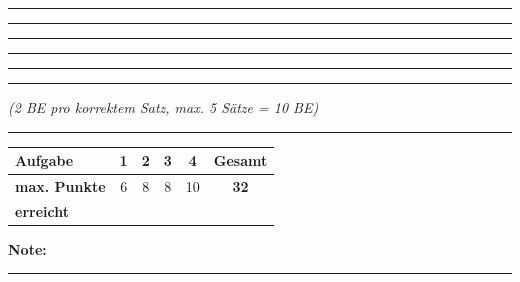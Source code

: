 \documentclass[11pt, a4paper]{article}
\newcommand{\luecke}[1]{\rule{#1}{0.4pt}}
\begin{document}
\vspace{0.8em}

\noindent
\rule{\textwidth}{0.4pt}

\vspace{1.2em}

\noindent
\rule{\textwidth}{0.4pt}

\vspace{1.2em}

\noindent
\rule{\textwidth}{0.4pt}

\vspace{1.2em}

\noindent
\rule{\textwidth}{0.4pt}

\vspace{1.2em}

\noindent
\rule{\textwidth}{0.4pt}

\vspace{1.2em}

\noindent
\rule{\textwidth}{0.4pt}

\vspace{0.5em}

\noindent\textit{(2 BE pro korrektem Satz, max. 5 Sätze = 10 BE)}


\vspace{25pt}
\hrule
\vspace{10pt}

\noindent
\begin{tabularx}{\textwidth}{|X|c|c|c|c||c|}
\hline
\textbf{Aufgabe} & 1 & 2 & 3 & 4 & \textbf{Gesamt} \\
\hline
\textbf{max. Punkte} & 6 & 8 & 8 & 10 & \textbf{32} \\
\hline
\textbf{erreicht} & & & & & \\[0.8em]
\hline
\end{tabularx}

\vspace{10pt}

\begin{flushright}
\textbf{Note:} \luecke{2cm}
\end{flushright}
\end{document}
